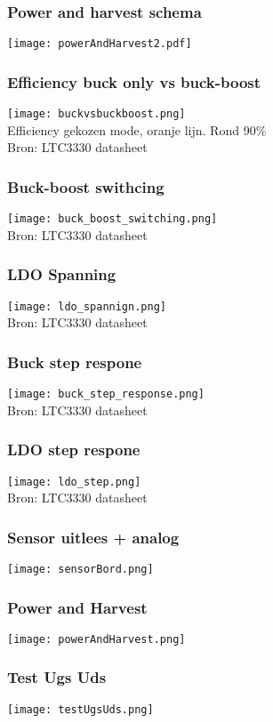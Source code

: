 \begin{frame}
    \frametitle{Power and harvest schema}
    \centering
    \texttt{[image: powerAndHarvest2.pdf]}
\end{frame}

\begin{frame}
    \frametitle{Efficiency buck only vs buck-boost}
    \centering
    \texttt{[image: buckvsbuckboost.png]}\\
    Efficiency gekozen mode, oranje lijn. Rond 90\%\\
    Bron: LTC3330 datasheet
\end{frame}

\begin{frame}
    \frametitle{Buck-boost swithcing}
    \centering
    \texttt{[image: buck\_boost\_switching.png]}\\
    Bron: LTC3330 datasheet
\end{frame}

\begin{frame}
    \frametitle{LDO Spanning}
    \centering
    \texttt{[image: ldo\_spannign.png]}\\
    Bron: LTC3330 datasheet
\end{frame}

\begin{frame}
    \frametitle{Buck step respone}
    \centering
    \texttt{[image: buck\_step\_response.png]}\\
    Bron: LTC3330 datasheet
\end{frame}

\begin{frame}
    \frametitle{LDO step respone}
    \centering
    \texttt{[image: ldo\_step.png]}\\
    Bron: LTC3330 datasheet
\end{frame}

\begin{frame}
    \frametitle{Sensor uitlees + analog}
    \centering
    \texttt{[image: sensorBord.png]}\\
\end{frame}

\begin{frame}
    \frametitle{Power and Harvest}
    \centering
    \texttt{[image: powerAndHarvest.png]}\\
\end{frame}

\begin{frame}
    \frametitle{Test Ugs Uds}
    \centering
    \texttt{[image: testUgsUds.png]}\\
\end{frame}

